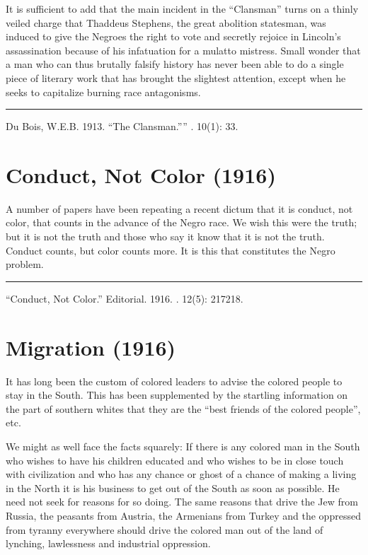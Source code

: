 \documentclass[letterpaper,10pt,english]{jupyterBook}
\begin{document}
\sphinxAtStartPar
It is sufficient to add that the main incident in the “Clansman” turns on a thinly veiled charge that Thaddeus Stephens, the great abolition statesman, was induced to give the Negroes the right to vote and secretly rejoice in Lincoln’s assassination because of his infatuation for a mulatto mistress. Small wonder that a man who can thus brutally falsify history has never been able to do a single piece of literary work that has brought the slightest attention, except when he seeks to capitalize burning race antagonisms.


\bigskip\hrule\bigskip


\sphinxAtStartPar
{} Du Bois, W.E.B. 1913. “The Clansman.”” . 10(1): 33.


\section{Conduct, Not Color (1916)}
\label{\detokenize{Volumes/12/05/conduct_not_color:conduct-not-color-1916}}\label{\detokenize{Volumes/12/05/conduct_not_color::doc}}
\sphinxAtStartPar
A number of papers have been repeating a recent dictum that it is conduct, not color, that counts in the advance  of the Negro race. We wish this were the truth; but it is not the truth and those who say it know that it is not the truth. Conduct counts, but color counts more. It is this that constitutes the Negro problem.


\bigskip\hrule\bigskip


\sphinxAtStartPar
{} “Conduct, Not Color.” Editorial. 1916. . 12(5): 217\sphinxhyphen{}218.


\section{Migration (1916)}
\label{\detokenize{Volumes/12/06/migration:migration-1916}}\label{\detokenize{Volumes/12/06/migration::doc}}
\sphinxAtStartPar
It has long been the custom of colored leaders to advise the colored people to stay in the South. This has been supplemented by the startling information on the part of southern whites
that they are the “best friends of the colored people”, etc.

\sphinxAtStartPar
We might as well face the facts squarely: If there is any colored man in the South who wishes to have his children educated and who wishes to be in close touch with civilization and who has any chance or ghost of a chance of making a living in the North it is his business to get out of the South as soon as possible. He need not seek for reasons for so doing. The same reasons that drive the Jew from Russia, the peasants from Austria, the Armenians from Turkey and the oppressed from tyranny everywhere should drive the colored man out of the land of lynching, lawlessness and industrial oppression.
\end{document}
